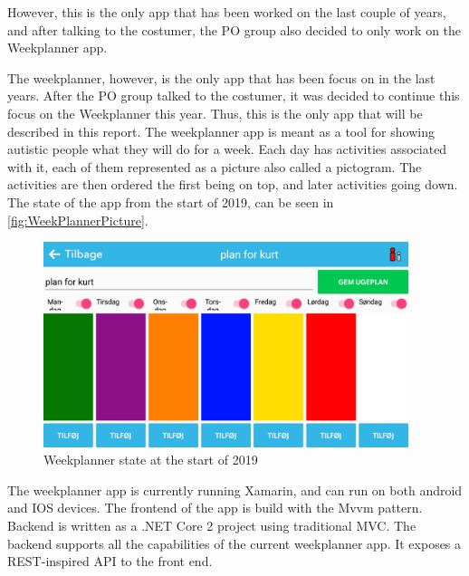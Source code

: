 However, this is the only app that has been worked on the last couple of years, and after talking to the costumer, the \gls{PO} group also decided to only work on the Weekplanner app.  \newline

\par \noindent
The weekplanner, however, is the only app that has been focus on in the last years. After the \gls{PO} group talked to the costumer, it was decided to continue this focus on the Weekplanner this year. Thus, this is the only app that will be described in this report.  \newline
The weekplanner app is meant as a tool for showing autistic people what they will do for a week. Each day has activities associated with it, each of them represented as a picture also called a pictogram. The activities are then ordered the first being on top, and later activities going down. The state of the app from the start of 2019, can be seen in \autoref{fig:WeekPlannerPicture}.

\begin{figure}[ht]
        \begin{center}
            \includegraphics[width=0.95\textwidth]{figures/WeekPlannerPicture}
        \end{center}
        \caption{Weekplanner state at the start of 2019}
        \label{fig:WeekPlannerPicture}
\end{figure}

\noindent
The weekplanner app is currently running Xamarin, and can run on both android and IOS devices. The frontend of the app is build with the \gls{Mvvm} pattern.
Backend is written as a .NET Core 2 project using traditional MVC. The backend supports all the capabilities of the current weekplanner app. It exposes a REST-inspired API to the front end.
